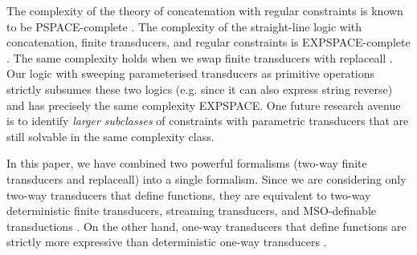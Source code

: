 The complexity of the theory of concatenation with regular constraints is
known to be PSPACE-complete \cite{Plandowski,J17}.
The complexity of the straight-line logic with concatenation, finite
transducers, and regular constraints is EXPSPACE-complete \cite{LB16}. The same 
complexity holds when we swap finite transducers with replaceall 
\cite{CCHLW18}. Our logic with sweeping parameterised transducers
as primitive operations strictly subsumes these two logics (e.g. since it can
also express string reverse) and has precisely the same complexity EXPSPACE.
One future research avenue is to identify \emph{larger subclasses} of
constraints with parametric transducers that are still solvable in the same 
complexity class.
%

In this paper, we have combined two powerful formalisms 
(two-way finite transducers and replaceall) into a single formalism. Since we 
are considering
only two-way transducers that define functions, they are equivalent to 
two-way deterministic finite transducers, streaming transducers, and
MSO-definable transductions 
\cite{EH01,AC10,AD11}. On the other hand, one-way transducers that define 
functions are strictly more expressive than deterministic one-way transducers
\cite{Berstel}. 


